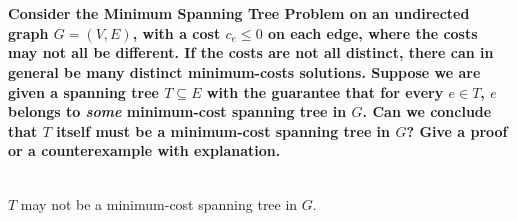 
\chapter{}
\textbf{
Consider the Minimum Spanning Tree Problem on an undirected graph $G=(V,E)$, with a cost $c_e\leq 0$ on each edge, where the costs may not all be different. If the costs are not all distinct, there can in general be many distinct minimum-costs solutions. Suppose we are given a spanning tree $T\subseteq E$ with the guarantee that for every $e\in T$, $e$ belongs to \emph{some} minimum-cost spanning tree in $G$. Can we conclude that $T$ itself must be a minimum-cost spanning tree in $G$? Give a proof or a counterexample with explanation.
}

\hspace*{\fill} \\

\noindent
$T$ may not be a minimum-cost spanning tree in $G$.

